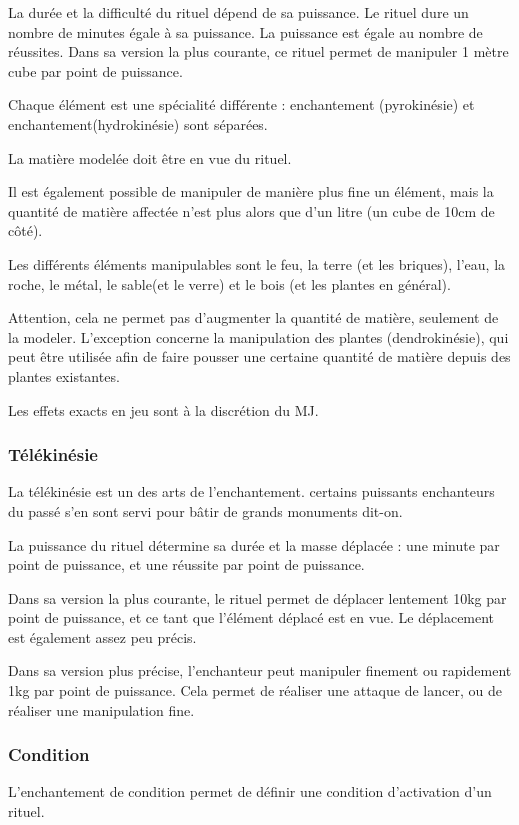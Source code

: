 \documentclass[10pt,a4paper,twocolumn]{book}
\begin{document}
La durée et la difficulté du rituel dépend de sa puissance. Le rituel dure un nombre de minutes égale à sa puissance. La puissance est égale au nombre de réussites. Dans sa version la plus courante, ce rituel permet de manipuler 1 mètre cube par point de puissance. 

 Chaque élément est une spécialité différente : enchantement (pyrokinésie) et enchantement(hydrokinésie) sont séparées.

La matière modelée doit être en vue du rituel. 

Il est également possible de manipuler de manière plus fine un élément, mais la quantité de matière affectée n'est plus alors que d'un litre (un cube de 10cm de côté).

Les différents éléments manipulables sont le feu, la terre (et les briques), l'eau, la roche, le métal, le sable(et le verre) et le bois (et les plantes en général).

Attention, cela ne permet pas d'augmenter la quantité de matière, seulement de la modeler. L'exception concerne la manipulation des plantes (dendrokinésie), qui peut être utilisée afin de faire pousser une certaine quantité de matière depuis des plantes existantes.

Les effets exacts en jeu sont à la discrétion du MJ. 

\subsubsection{Télékinésie}
La télékinésie est un des arts de l'enchantement. certains puissants enchanteurs du passé s'en sont servi pour bâtir de grands monuments dit-on.

La puissance du rituel détermine sa durée et la masse déplacée : une minute par point de puissance, et une réussite par point de puissance.

Dans sa version la plus courante, le rituel permet de déplacer lentement 10kg par point de puissance, et ce tant que l'élément déplacé est en vue. Le déplacement est également assez peu précis.

Dans sa version plus précise, l'enchanteur peut manipuler finement ou rapidement 1kg par point de puissance. Cela permet de réaliser une attaque de lancer, ou de réaliser une manipulation fine.
\subsubsection{Condition}
L'enchantement de condition permet de définir une condition d'activation d'un rituel. 
\end{document}

